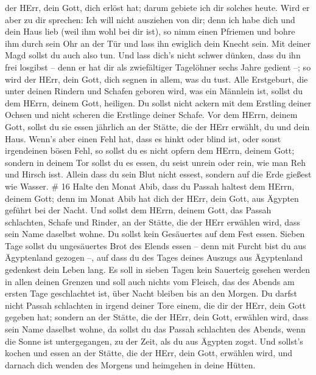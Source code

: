 der HErr, dein Gott, dich erlöst hat; darum gebiete ich dir solches
heute.  Wird er aber zu dir sprechen: Ich will nicht
ausziehen von dir; denn ich habe dich und dein Haus lieb (weil ihm wohl
bei dir ist),  so nimm einen Pfriemen und bohre ihm durch
sein Ohr an der Tür und lass ihn ewiglich dein Knecht sein. Mit deiner
Magd sollst du auch also tun.  Und lass dich's nicht schwer
dünken, dass du ihn frei losgibst -- denn er hat dir als zwiefältiger
Tagelöhner sechs Jahre gedient --; so wird der HErr, dein Gott, dich
segnen in allem, was du tust.  Alle Erstgeburt, die unter
deinen Rindern und Schafen geboren wird, was ein Männlein ist, sollst du
dem HErrn, deinem Gott, heiligen. Du sollst nicht ackern mit dem
Erstling deiner Ochsen und nicht scheren die Erstlinge deiner Schafe.
 Vor dem HErrn, deinem Gott, sollst du sie essen jährlich
an der Stätte, die der HErr erwählt, du und dein Haus. 
Wenn's aber einen Fehl hat, dass es hinkt oder blind ist, oder sonst
irgendeinen bösen Fehl, so sollst du es nicht opfern dem HErrn, deinem
Gott;  sondern in deinem Tor sollst du es essen, du seist
unrein oder rein, wie man Reh und Hirsch isst.  Allein dass
du sein Blut nicht essest, sondern auf die Erde gießest wie Wasser. \#
16  Halte den Monat Abib, dass du Passah haltest dem HErrn,
deinem Gott; denn im Monat Abib hat dich der HErr, dein Gott, aus
Ägypten geführt bei der Nacht.  Und sollst dem HErrn, deinem
Gott, das Passah schlachten, Schafe und Rinder, an der Stätte, die der
HErr erwählen wird, dass sein Name daselbst wohne.  Du
sollst kein Gesäuertes auf dem Fest essen. Sieben Tage sollst du
ungesäuertes Brot des Elends essen -- denn mit Furcht bist du aus
Ägyptenland gezogen --, auf dass du des Tages deines Auszugs aus
Ägyptenland gedenkest dein Leben lang.  Es soll in sieben
Tagen kein Sauerteig gesehen werden in allen deinen Grenzen und soll
auch nichts vom Fleisch, das des Abends am ersten Tage geschlachtet ist,
über Nacht bleiben bis an den Morgen.  Du darfst nicht
Passah schlachten in irgend deiner Tore einem, die dir der HErr, dein
Gott gegeben hat;  sondern an der Stätte, die der HErr, dein
Gott, erwählen wird, dass sein Name daselbst wohne, da sollst du das
Passah schlachten des Abends, wenn die Sonne ist untergegangen, zu der
Zeit, als du aus Ägypten zogst.  Und sollst's kochen und
essen an der Stätte, die der HErr, dein Gott, erwählen wird, und darnach
dich wenden des Morgens und heimgehen in deine Hütten. 
